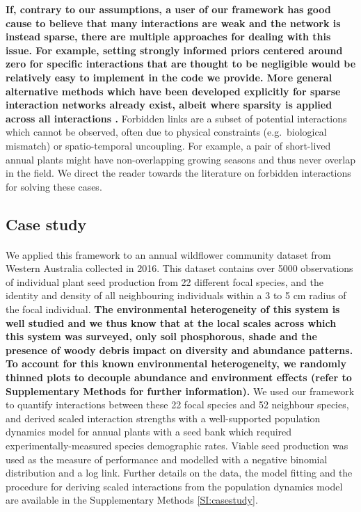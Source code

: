 \documentclass[a4,12pt]{article}
\begin{document}
\begin{refsection}
    \textbf{If, contrary to our assumptions, a user of our framework has good cause to believe that many interactions are weak and the network is instead sparse, there are multiple approaches for dealing with this issue. For example, setting strongly informed priors centered around zero for specific interactions that are thought to be negligible would be relatively easy to implement in the code we provide. More general alternative methods which have been developed explicitly for sparse interaction networks already exist, albeit where sparsity is applied across all interactions \parencite{Weiss-Lehman2022}.} Forbidden links are a subset of potential interactions which cannot be observed, often due to physical constraints (e.g.\ biological mismatch) or spatio-temporal uncoupling. For example, a pair of short-lived annual plants might have non-overlapping growing seasons and thus never overlap in the field. We direct the reader towards the literature on forbidden interactions \parencite{Olesen2011, Jordano2016} for solving these cases. 

    \subsection{Case study}

       \paragraph{}
        We applied this framework to an annual wildflower community dataset from Western Australia collected in 2016. This dataset contains over 5000 observations of individual plant seed production from 22 different focal species, and the identity and density of all neighbouring individuals within a 3 to 5 cm radius of the focal individual. \textbf{The environmental heterogeneity of this system is well studied \parencite{Dwyer2015} and we thus know that at the local scales across which this system was surveyed, only soil phosphorous, shade and the presence of woody debris impact on diversity and abundance patterns. To account for this known environmental heterogeneity, we randomly thinned plots to decouple abundance and environment effects (refer to Supplementary Methods for further information).} We used our framework to quantify interactions between these 22 focal species and 52 neighbour species, and derived scaled interaction strengths with a well-supported population dynamics model for annual plants with a seed bank \parencite{Levine2009, Bimler2018} which required experimentally-measured species demographic rates. Viable seed production was used as the measure of performance and modelled with a negative binomial distribution and a log link. Further details on the data, the model fitting and the procedure for deriving scaled interactions from the population dynamics model are available in the Supplementary Methods \ref{SI:casestudy}.



\end{refsection}
\end{document}
